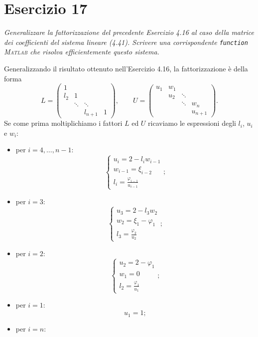 
\section{Esercizio 17}
\label{sub:Esercizio 17}
\emph{Generalizzare la fattorizzazione del precedente Esercizio 4.16 al caso della matrice dei coefficienti del sistema lineare
(4.41). Scrivere una corrispondente \lstinline{function} \textsc{Matlab} che risolva efficientemente questo sistema.
}
\begin{sol}
	Generalizzando il risultato ottenuto nell'Esercizio 4.16, la fattorizzazione è della forma
	\[
		L=\begin{pmatrix}
			1 & & &\\
			l_2 & 1 & &\\
			& \ddots & \ddots &\\
			& & l_{n+1} & 1
		\end{pmatrix},\qquad U=\begin{pmatrix}
			u_1 & w_1 & &\\
			& u_2 & \ddots &\\
			& & \ddots & w_n\\
			& & & u_{n+1}
		\end{pmatrix}.
	\]
	Se come prima moltiplichiamo i fattori $L$ ed $U$ ricaviamo le espressioni degli $l_i$, $u_i$ e $w_i$:
	\begin{itemize}
		\item per $i=4,\dots,n-1$:
			\[
				\begin{cases}
					u_i=2-l_iw_{i-1}\\
					w_{i-1}=\xi_{i-2}\\
					l_i=\frac{\varphi_{i-1}}{u_{i-1}}
				\end{cases};
			\]
		\item per $i=3$:
			\[
				\begin{cases}
					u_3=2-l_3w_2\\
					w_2=\xi_1-\varphi_1\\
					l_3=\frac{\varphi_2}{u_2}
				\end{cases};
			\]
		\item per $i=2$:
			\[
				\begin{cases}
					u_2=2-\varphi_1\\
					w_1=0\\
					l_2=\frac{\varphi_1}{u_1}
				\end{cases};
			\]
		\item per $i=1$:
			$$u_1=1;$$
		\item per $i=n$:

\end{itemize}
\end{sol}
